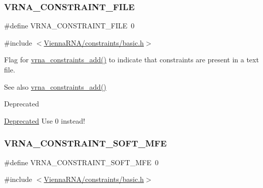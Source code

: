 \subsubsection{\texorpdfstring{V\+R\+N\+A\+\_\+\+C\+O\+N\+S\+T\+R\+A\+I\+N\+T\+\_\+\+F\+I\+LE}{VRNA\_CONSTRAINT\_FILE}}
{\footnotesize\ttfamily \#define V\+R\+N\+A\+\_\+\+C\+O\+N\+S\+T\+R\+A\+I\+N\+T\+\_\+\+F\+I\+LE~0}



{\ttfamily \#include $<$\hyperlink{constraints_2basic_8h}{Vienna\+R\+N\+A/constraints/basic.\+h}$>$}



Flag for \hyperlink{group__constraints_ga35a401f680969a556858a8dd5f1d07cc}{vrna\+\_\+constraints\+\_\+add()} to indicate that constraints are present in a text file. 

\begin{DoxySeeAlso}{See also}
\hyperlink{group__constraints_ga35a401f680969a556858a8dd5f1d07cc}{vrna\+\_\+constraints\+\_\+add()} 
\end{DoxySeeAlso}
\begin{DoxyRefDesc}{Deprecated}
\item[\hyperlink{deprecated__deprecated000148}{Deprecated}]Use 0 instead!\end{DoxyRefDesc}
\mbox{\label{group__constraints_ga62aa195893d02d1a79ca94952748df36}} 
\subsubsection{\texorpdfstring{V\+R\+N\+A\+\_\+\+C\+O\+N\+S\+T\+R\+A\+I\+N\+T\+\_\+\+S\+O\+F\+T\+\_\+\+M\+FE}{VRNA\_CONSTRAINT\_SOFT\_MFE}}
{\footnotesize\ttfamily \#define V\+R\+N\+A\+\_\+\+C\+O\+N\+S\+T\+R\+A\+I\+N\+T\+\_\+\+S\+O\+F\+T\+\_\+\+M\+FE~0}



{\ttfamily \#include $<$\hyperlink{constraints_2basic_8h}{Vienna\+R\+N\+A/constraints/basic.\+h}$>$}



